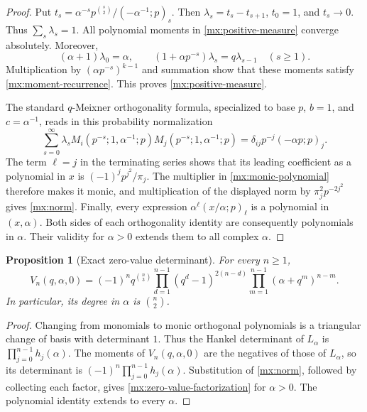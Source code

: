 \documentclass[11pt]{article}
\numberwithin{equation}{section}
\newtheorem{proposition}[proposition]{Proposition}
\theoremstyle{definition}
\theoremstyle{remark}
\begin{document}
\begin{proof}
Put
$t_s=\alpha^{-s}p^{\binom{s}{2}}/(-\alpha^{-1};p)_s$.
Then $\lambda_s=t_s-t_{s+1}$, $t_0=1$, and $t_s\to0$.
Thus $\sum_s\lambda_s=1$.
All polynomial moments in \eqref{mx:positive-measure} converge absolutely.
Moreover,
\[
 (\alpha+1)\lambda_0=\alpha,\qquad
 (1+\alpha p^{-s})\lambda_s=q\lambda_{s-1}\quad(s\ge1).
\]
Multiplication by $(\alpha p^{-s})^{k-1}$ and summation show that these
moments satisfy \eqref{mx:moment-recurrence}.  This proves
\eqref{mx:positive-measure}.

The standard $q$-Meixner orthogonality formula, specialized to base $p$,
$b=1$, and $c=\alpha^{-1}$, reads in this probability normalization
\[
 \sum_{s=0}^{\infty}\lambda_s
 M_i(p^{-s};1,\alpha^{-1};p)
 M_j(p^{-s};1,\alpha^{-1};p)
 =\delta_{ij}p^{-j}(-\alpha p;p)_j.
\]
The term $\ell=j$ in the terminating series shows that its leading
coefficient as a polynomial in $x$ is
$(-1)^jp^{j^2}/\pi_j$.  The multiplier in
\eqref{mx:monic-polynomial} therefore makes it monic, and multiplication
of the displayed norm by $\pi_j^2p^{-2j^2}$ gives \eqref{mx:norm}.
Finally, every expression
$\alpha^\ell(x/\alpha;p)_\ell$
is a polynomial in $(x,\alpha)$.  Both sides of each orthogonality
identity are consequently polynomials in $\alpha$.  Their validity for
$\alpha>0$ extends them to all complex $\alpha$.
\end{proof}

\begin{proposition}[Exact zero-value determinant]\label{mx:zero-value-product}
For every $n\ge1$,
\begin{equation}\label{mx:zero-value-factorization}
 V_n(q,\alpha,0)
 =(-1)^nq^{\binom n3}
 \prod_{d=1}^{n-1}(q^d-1)^{2(n-d)}
 \prod_{m=1}^{n-1}(\alpha+q^m)^{n-m}.
\end{equation}
In particular, its degree in $\alpha$ is $\binom n2$.
\end{proposition}

\begin{proof}
Changing from monomials to monic orthogonal polynomials is a triangular
change of basis with determinant $1$.  Thus the Hankel determinant of
$L_\alpha$ is $\prod_{j=0}^{n-1}h_j(\alpha)$.
The moments of $V_n(q,\alpha,0)$ are the negatives of those of
$L_\alpha$, so its determinant is
$(-1)^n\prod_{j=0}^{n-1}h_j(\alpha)$.
Substitution of \eqref{mx:norm}, followed by collecting each factor,
gives \eqref{mx:zero-value-factorization} for $\alpha>0$.
The polynomial identity extends to every $\alpha$.
\end{proof}
\end{document}

